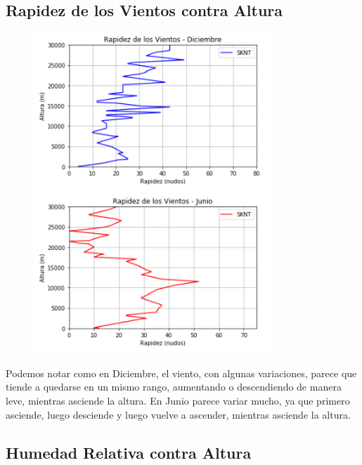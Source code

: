 \documentclass[a4paper]{article}
\begin{document}
\subsection{Rapidez de los Vientos contra Altura}
\bigskip
 \begin{figure}[h!]
 \centering
  \includegraphics[width=0.8\textwidth]{Grafica4.PNG}
 \end{figure}
\bigskip
Podemos notar como en Diciembre, el viento, con algunas variaciones, parece que tiende a quedarse en un mismo rango, aumentando o descendiendo de manera leve, mientras asciende la altura. En Junio parece variar mucho, ya que primero asciende, luego desciende y luego vuelve a ascender, mientras asciende la altura.

\pagebreak
\subsection{Humedad Relativa contra Altura}
\end{document}
